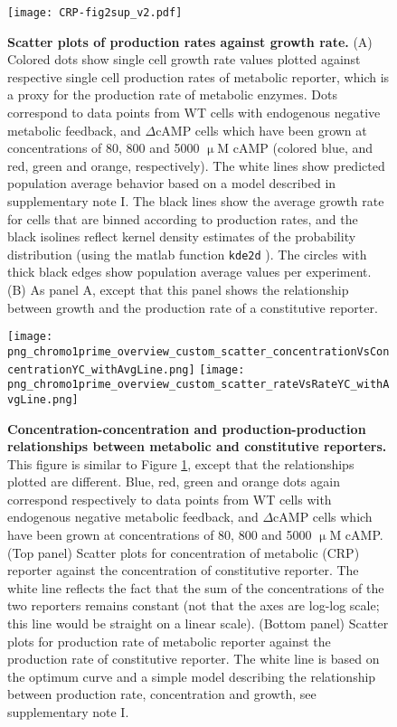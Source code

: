 \begin{figure}
	\centering
	\texttt{[image: CRP-fig2sup\_v2.pdf]}
	\caption{ 
	\textbf{Scatter plots of production rates against growth rate.}
	(A) Colored dots show single cell growth rate values plotted against respective single cell production rates of metabolic reporter, which is a proxy for the production rate of metabolic enzymes. 	
	Dots correspond to data points from WT cells with endogenous negative metabolic feedback, and $\Delta$cAMP cells which have been grown at concentrations of 80, 800 and 5000 $\upmu$M cAMP 
	(colored blue, and red, green and orange, respectively).
    The white lines show predicted population average behavior based on a model described in supplementary note I.
	The black lines show the average growth rate for cells that are binned according to production rates, and the black isolines reflect kernel density estimates of the probability distribution (using the matlab function \texttt{kde2d} \cite{Botev2010}).
	The circles with thick black edges show population average values per experiment.
	(B) As panel A, except that this panel shows the relationship between growth and the production rate of a constitutive reporter. 	
	}
	\label{fig:CRP:fig2sup}
\end{figure}

\begin{figure}
	\centering
	\texttt{[image: png\_chromo1prime\_overview\_custom\_scatter\_concentrationVsConcentrationYC\_withAvgLine.png]}
	\texttt{[image: png\_chromo1prime\_overview\_custom\_scatter\_rateVsRateYC\_withAvgLine.png]}	
	\caption{ 
		\textbf{Concentration-concentration and production-production relationships between metabolic and constitutive reporters.}
    	This figure is similar to Figure \ref{fig:CRP:fig2sup}, except that the relationships plotted are different.
      	Blue, red, green and orange dots again correspond respectively to data points from WT cells with endogenous negative metabolic feedback, and $\Delta$cAMP cells which have been grown at concentrations of 80, 800 and 5000 $\upmu$M cAMP.
		(Top panel) Scatter plots for concentration of metabolic (CRP) reporter against the concentration of constitutive reporter.
        The white line reflects the fact that the sum of the concentrations of the two reporters remains constant 
        (not that the axes are log-log scale; this line would be straight on a linear scale).
		(Bottom panel) Scatter plots for production rate of metabolic reporter against the production rate of constitutive reporter.
        The white line is based on the optimum curve and a simple model describing the relationship between production rate, concentration and growth, 
        see supplementary note I.
	}
	\label{fig:CRP:fig3scatters_CC_pp}
\end{figure}



